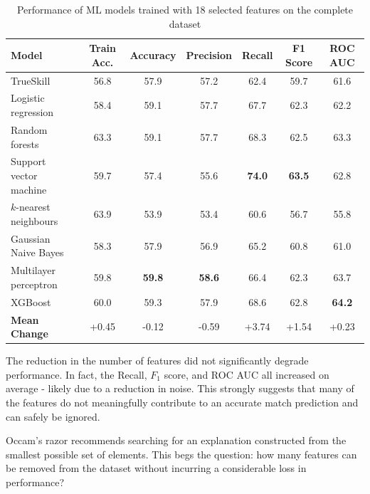 \begin{table}[h!]
	\centering
	\small
	\begin{adjustbox}{center} %
		\begin{tabular}{ |l|c|c|c|c|c|c| }
			\hline
			\rule{0pt}{2.6ex} \textbf{Model} & \textbf{Train Acc.} & \textbf{Accuracy} & \textbf{Precision} & \textbf{Recall} & \textbf{F1 Score} & \textbf{ROC AUC} \\
			\hline
			\rule{0pt}{2.6ex} TrueSkill                 & 56.8 & 57.9 & 57.2 & 62.4 & 59.7 & 61.6 \\ \hline
			\rule{0pt}{2.6ex} Logistic regression 		& 58.4 & 59.1 & 57.7 & 67.7 & 62.3 & 62.2 \\
			\rule{0pt}{2.6ex} Random forests 			& 63.3 & 59.1 & 57.7 & 68.3 & 62.5 & 63.3 \\
			\rule{0pt}{2.6ex} Support vector machine 	& 59.7 & 57.4 & 55.6 & \textbf{74.0} & \textbf{63.5} & 62.8 \\
			\rule{0pt}{2.6ex} $k$-nearest neighbours 	& 63.9 & 53.9 & 53.4 & 60.6 & 56.7 & 55.8 \\
			\rule{0pt}{2.6ex} Gaussian Naive Bayes 		& 58.3 & 57.9 & 56.9 & 65.2 & 60.8 & 61.0 \\
			\rule{0pt}{2.6ex} Multilayer perceptron     & 59.8 & \textbf{59.8} & \textbf{58.6} & 66.4 & 62.3 & 63.7 \\
			\rule{0pt}{2.6ex} XGBoost 					& 60.0 & 59.3 & 57.9 & 68.6 & 62.8 & \textbf{64.2} \\
			\hline
			\rule{0pt}{2.6ex} \textbf{Mean Change} 		& +0.45 & -0.12 & -0.59 & +3.74 & +1.54 & +0.23 \\
			\hline
		\end{tabular}
	\end{adjustbox}
	\caption{Performance of ML models trained with 18 selected features on the complete dataset}
	\label{table:2}
\end{table}


The reduction in the number of features did not significantly degrade performance. In fact, the Recall, $F_1$ score, and ROC AUC all increased on average - likely due to a reduction in noise. This strongly suggests that many of the features do not meaningfully contribute to an accurate match prediction and can safely be ignored.

Occam's razor recommends searching for an explanation constructed from the smallest possible set of elements. This begs the question: how many features can be removed from the dataset without incurring a considerable loss in performance? 

